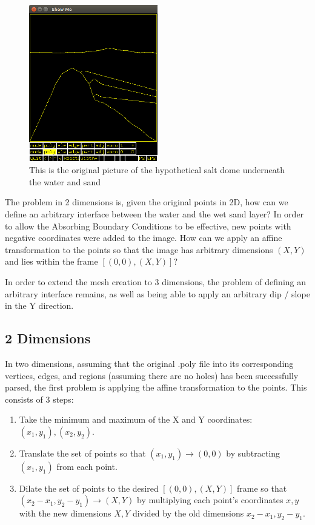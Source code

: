 \begin{figure}[H]
\centering
\includegraphics[width=0.5\textwidth]{Images/Original-Couches5.png}
\caption{This is the original picture of the hypothetical salt dome underneath the water and sand}
\label{fig:originalCouches5}
\end{figure}

The problem in 2 dimensions is, given the original points in 2D, how can we define an arbitrary interface between the water and the wet sand layer? In order to allow the Absorbing Boundary Conditions to be effective, new points with negative coordinates were added to the image. How can we apply an affine transformation to the points so that the image has arbitrary dimensions $(X,Y)$ and lies within the frame $[(0,0),(X,Y)]$? 

In order to extend the mesh creation to 3 dimensions, the problem of defining an arbitrary interface remains, as well as being able to apply an arbitrary dip / slope in the Y direction. 



\subsection{2 Dimensions}

In two dimensions, assuming that the original .poly file into its corresponding vertices, edges, and regions (assuming there are no holes) has been successfully parsed, the first problem is applying the affine transformation to the points. This consists of 3 steps:

\begin{enumerate}
\item Take the minimum and maximum of the X and Y coordinates: $(x_1, y_1), (x_2, y_2)$.
\item Translate the set of points so that $(x_1,y_1) \rightarrow (0,0)$ by subtracting $(x_1,y_1)$ from each point.
\item Dilate the set of points to the desired $[(0,0),(X,Y)]$ frame so that $(x_2 - x_1, y_2 - y_1) \rightarrow (X,Y)$ by multiplying each point's coordinates $x,y$ with the new dimensions $X,Y$ divided by the old dimensions $x_2 - x_1, y_2 - y_1$.
\end{enumerate}

